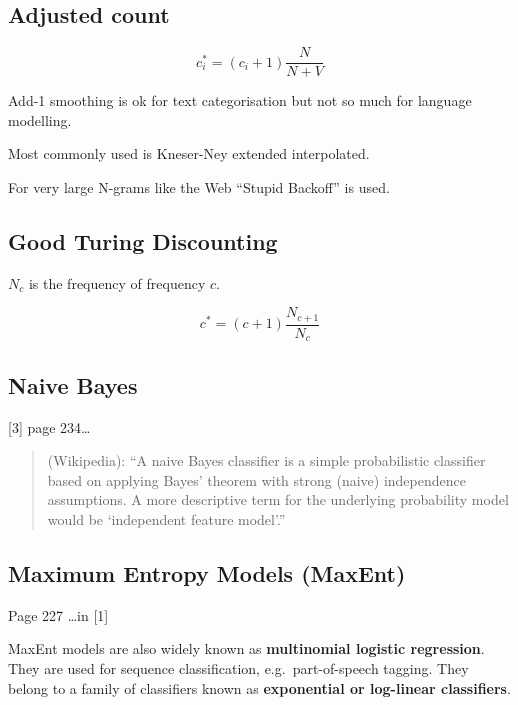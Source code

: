 \subsection*{Adjusted count}

\begin{equation}
  c_i^* = (c_i+1)\frac{N}{N+V}
  \label{eq:ci}
\end{equation}

Add-1 smoothing is ok for text categorisation but not so much for language modelling.

Most commonly used is Kneser-Ney extended interpolated.

For very large N-grams like the Web “Stupid Backoff” is used.


\subsection*{Good Turing Discounting}

$N_c$ is the frequency of frequency $c$.

\begin{equation}
  c^* = (c+1)\frac{N_{c+1}}{N_c}
  \label{eq:cstar}
\end{equation}


\subsection*{Naive Bayes}

[3] page 234…

\begin{quote}
  (Wikipedia): ``A naive Bayes classifier is a simple probabilistic classifier based on applying Bayes' theorem with strong (naive) independence assumptions. A more descriptive term for the underlying probability model would be `independent feature model'.''
\end{quote}


\subsection*{Maximum Entropy Models (MaxEnt)}

Page 227 \ldots in [1]

MaxEnt models are also widely known as \textbf{multinomial logistic regression}. They are used for sequence classification, e.g.\ part-of-speech tagging. They belong to a family of classifiers known as \textbf{exponential or log-linear classifiers}.

